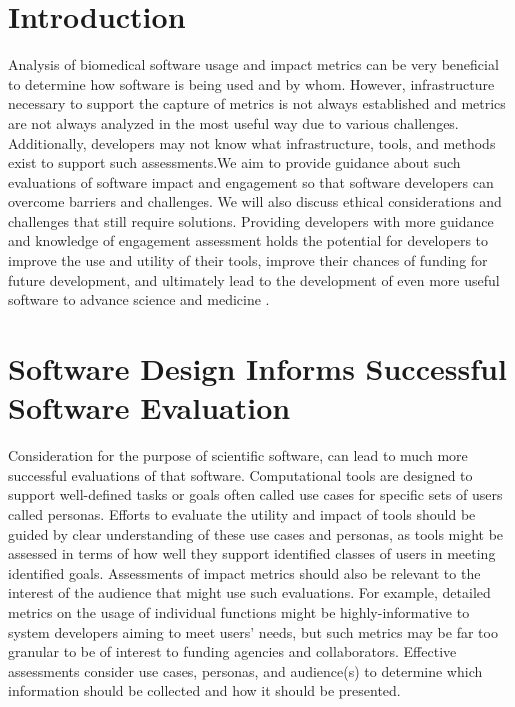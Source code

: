 \documentclass{article}
\begin{document}
\section{Introduction}
Analysis of biomedical software usage and impact metrics can be very beneficial to determine how software is being used and by whom. However, infrastructure necessary to support the capture of metrics is not always established and metrics are not always analyzed in the most useful way due to various challenges. Additionally, developers may not know what infrastructure, tools, and methods exist to support such assessments.We aim to provide guidance about such evaluations of software impact and engagement so that software developers can overcome barriers and challenges. We will also discuss ethical considerations and challenges that still require solutions. Providing developers with more guidance and knowledge of engagement assessment holds the potential for developers to improve the use and utility of their tools, improve their chances of funding for future development, and ultimately lead to the development of even more useful software to advance science and medicine \cite{wratten_reproducible_2021}. 


\section{Software Design Informs Successful Software Evaluation}
\label{sec:headings}
Consideration for the purpose of scientific software, can lead to much more successful evaluations of that software. Computational tools are designed to support well-defined tasks or goals often called use cases \cite{gamma_design_1995} for specific sets of users called personas\cite{cooper_inmates_2004}. Efforts to evaluate the utility and impact of tools should be guided by clear understanding of these use cases and personas, as tools might be assessed in terms of how well they support identified classes of users in meeting identified goals. Assessments of impact metrics should also be relevant to the interest of the audience that might use such evaluations. For example, detailed metrics on the usage of individual functions might be highly-informative to system developers aiming to meet users’ needs, but such metrics may be far too granular to be of interest to funding agencies and collaborators.  Effective assessments consider use cases, personas, and audience(s) to determine which information should be collected and how it should be presented. 
\end{document}
